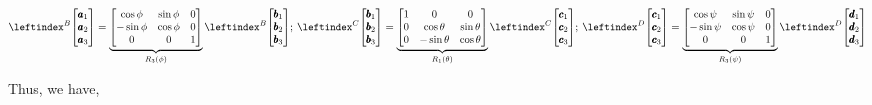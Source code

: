 \begin{align*}
     \lx{^B}{\bm{\pmb a_1 \\ \pmb a_2 \\ \pmb a_3}} =
     \underbrace{
        \bm{
            \cos \phi & \sin \phi  & 0\\
            -\sin \phi & \cos \phi & 0\\
            0          & 0         & 1
        }
     } _ {R_3 (\phi)}
    \lx{^B}{\bm{\pmb b_1 \\ \pmb b_2 \\ \pmb b_3}} ;\:
    \lx{^C}{\bm{\pmb b_1 \\ \pmb b_2 \\ \pmb b_3}} =
    \underbrace{
        \bm{
            1 & 0 & 0\\
            0 & \cos \theta & \sin \theta\\
            0 & -\sin \theta & \cos \theta
        }
     } _ {R_1 (\theta)}
    \lx{^C}{\bm{\pmb c_1 \\ \pmb c_2 \\ \pmb c_3}} ;\:
    \lx{^D}{\bm{\pmb c_1 \\ \pmb c_2 \\ \pmb c_3}} =
     \underbrace{
        \bm{
            \cos \psi & \sin \psi  & 0\\
            -\sin \psi & \cos \psi & 0\\
            0          & 0         & 1
        }
     } _ {R_3 (\psi)}
    \lx{^D}{\bm{\pmb d_1 \\ \pmb d_2 \\ \pmb d_3}} \\
\end{align*}

Thus, we have,

